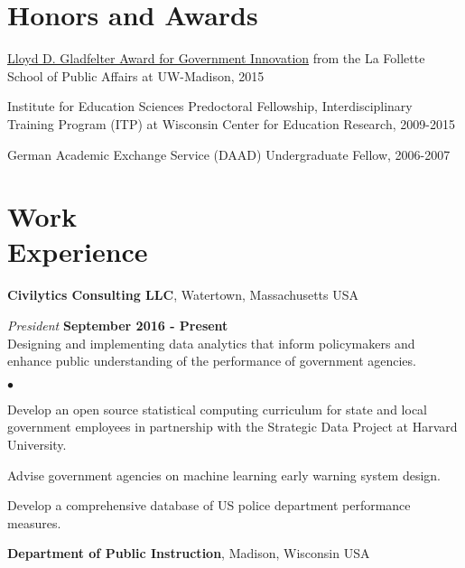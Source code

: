 \documentclass[margin,line]{res}
\newenvironment{list2}{
  \begin{list}{$\bullet$}{%
      \setlength{\itemsep}{0in}
      \setlength{\parsep}{0in} \setlength{\parskip}{0in}
      \setlength{\topsep}{0in} \setlength{\partopsep}{0in} 
      \setlength{\leftmargin}{0.2in}}}{\end{list}}
\begin{document}
\begin{resume}
\section{\sc Honors and Awards} 

\href{https://www.lafollette.wisc.edu/news/2015-gladfelter-winners-announced}{Lloyd D. Gladfelter Award for Government Innovation} from the La Follette School of Public Affairs at UW-Madison, 2015

\vspace*{-2.5mm}

Institute for Education Sciences Predoctoral Fellowship, Interdisciplinary Training Program (ITP) at Wisconsin Center for Education Research, 2009-2015

\vspace*{-2.5mm}
German Academic Exchange Service (DAAD) Undergraduate Fellow, 2006-2007

\section{\sc Work \\ Experience}
{\bf Civilytics Consulting LLC}, Watertown, Massachusetts USA

\vspace{-.3cm}
{\em President} \hfill {\bf September 2016 - Present}\\
Designing and implementing data analytics that inform policymakers and enhance 
public understanding of the performance of government agencies.\\
\vspace{-2mm}
\begin{list2}
\item Develop an open source statistical computing curriculum for state and 
local government employees in partnership with the Strategic Data Project at Harvard University.
\item Advise government agencies on machine learning early warning system design. 
\item Develop a comprehensive database of US police department performance measures.
\end{list2}
\vspace{-.1cm}

{\bf Department of Public Instruction}, Madison, Wisconsin USA


\end{resume}
\end{document}

